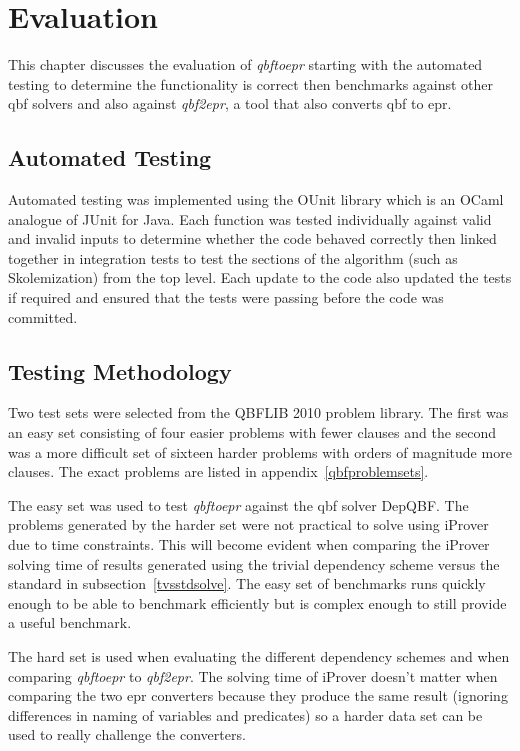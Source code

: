 \chapter{Evaluation} \label{evaluation}
This chapter discusses the evaluation of \textit{qbftoepr} starting with the automated testing to determine the functionality is correct then benchmarks against other \gls{qbf} solvers and also against \textit{qbf2epr}, a tool that also converts \gls{qbf} to \gls{epr}.

\section{Automated Testing}
Automated testing was implemented using the OUnit library which is an OCaml analogue of JUnit for Java. Each function was tested individually against valid and invalid inputs to determine whether the code behaved correctly then linked together in integration tests to test the sections of the algorithm (such as Skolemization) from the top level. Each update to the code also updated the tests if required and ensured that the tests were passing before the code was committed.

\section{Testing Methodology}
Two test sets were selected from the QBFLIB 2010 problem library. The first was an easy set consisting of four easier problems with fewer clauses and the second was a more difficult set of sixteen harder problems with orders of magnitude more clauses. The exact problems are listed in appendix~\ref{qbfproblemsets}.

The easy set was used to test \textit{qbftoepr} against the \gls{qbf} solver DepQBF. The problems generated by the harder set were not practical to solve using iProver due to time constraints. This will become evident when comparing the iProver solving time of results generated using the trivial dependency scheme versus the standard in subsection~\ref{tvsstdsolve}. The easy set of benchmarks runs quickly enough to be able to benchmark efficiently but is complex enough to still provide a useful benchmark.

The hard set is used when evaluating the different dependency schemes and when comparing \textit{qbftoepr} to \textit{qbf2epr}. The solving time of iProver doesn't matter when comparing the two \gls{epr} converters because they produce the same result (ignoring differences in naming of variables and predicates) so a harder data set can be used to really challenge the converters.

